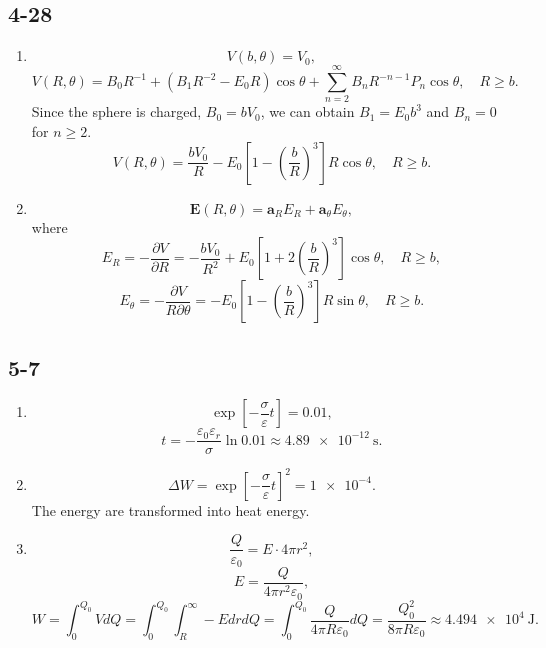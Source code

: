 \documentclass[6pt,a4paper]{article}
\begin{document}
\subsection{4-28}
\begin{enumerate}[label=\alph*)]
\item
$$V(b,\theta)=V_0,$$
$$V(R,\theta)=B_0R^{-1}+(B_1R^{-2}-E_0R)\cos\theta+\sum_{n=2}^\infty B_nR^{-n-1}P_n\cos\theta,\quad R\geqslant b.$$
Since the sphere is charged, $B_0=bV_0$, we can obtain $B_1=E_0b^3$ and $B_n=0$ for $n\geqslant2$.
$$V(R,\theta)=\frac{bV_0}{R}-E_0\left[1-\left(\frac{b}{R}\right)^3\right]R\cos\theta,\quad R\geqslant b.$$
\item
$$\mathbf{E}(R,\theta)=\mathbf{a}_RE_R+\mathbf{a}_\theta E_\theta,$$
where
$$E_R=-\frac{\partial V}{\partial R}=-\frac{bV_0}{R^2}+E_0\left[1+2\left(\frac{b}{R}\right)^3\right]\cos\theta,\quad R\geqslant b,$$
$$E_\theta=-\frac{\partial V}{R\partial \theta}=-E_0\left[1-\left(\frac{b}{R}\right)^3\right]R\sin\theta,\quad R\geqslant b.$$
\end{enumerate}

\subsection{5-7}
\begin{enumerate}[label=\alph*)]
\item
$$\exp\left[-\frac{\sigma}{\varepsilon}t\right]=0.01,$$
$$t=-\frac{\varepsilon_0\varepsilon_r}{\sigma}\ln0.01\approx \SI{4.89e-12}{\second}.$$
\item
$$\Delta W=\exp\left[-\frac{\sigma}{\varepsilon}t\right]^2=\num{1e-4}.$$
The energy are transformed into heat energy.
\item
$$\frac{Q}{\varepsilon_0}=E\cdot 4\pi r^2,$$
$$E=\frac{Q}{4\pi r^2\varepsilon_0},$$
$$W=\int_0^{Q_0} VdQ=\int_0^{Q_0}\int_R^\infty-EdrdQ=\int_0^{Q_0}\frac{Q}{4\pi R\varepsilon_0}dQ=\frac{Q_0^2}{8\pi R\varepsilon_0}\approx\SI{4.494e4}{\joule}.$$
\end{enumerate}
\end{document}
